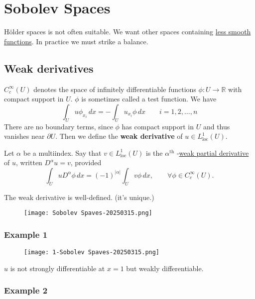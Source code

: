 \section{Sobolev Spaces}

Hölder spaces is not often suitable. We want other spaces containing \underline{less smooth functions}. In practice we must strike a balance.

\subsection{Weak derivatives}

$C^{\infty}_{c}(U)$ denotes the space of infinitely differentiable functions $\phi:U\to \mathbb{R}$ with compact support in $U$. $\phi$ is sometimes called a test function. We have
\[
\int_{U}^{} u\phi_{x_i} \, dx =-\int_{U}^{} u_{x_i}\phi \, dx \qquad i=1,2,\dots,n
\]
There are no boundary terms, since $\phi$ has compact support in $U$ and thus vanishes near $\partial U$. Then we define the \textbf{weak derivative} of $u\in L^{1}_{\text{loc}}(U)$.

Let $\alpha$ be a multiindex. Say that $v\in L^{1}_{\text{loc}}(U)$ is the $\alpha^{\text{th}}$ -\underline{weak partial derivative }of $u$, written $D^{\alpha}u=v$, provided
\[
\int_{U}^{} uD^{\alpha}\phi \, dx =(-1)^{\lvert \alpha \rvert }\int_{U}^{} v\phi \, dx ,\qquad \forall \phi\in C^{\infty}_{c}(U).
\]
\begin{note}
The weak derivative is well-defined. (it's unique.)
\begin{figure}[H]
\centering
\texttt{[image: Sobolev Spaves-20250315.png]}
\label{}
\end{figure}
\end{note}
\subsubsection{Example 1}

\begin{figure}[H]
\centering
\texttt{[image: 1-Sobolev Spaves-20250315.png]}
\label{}
\end{figure}

$u$ is not strongly differentiable at $x=1$ but weakly differentiable.

\subsubsection{Example 2}

